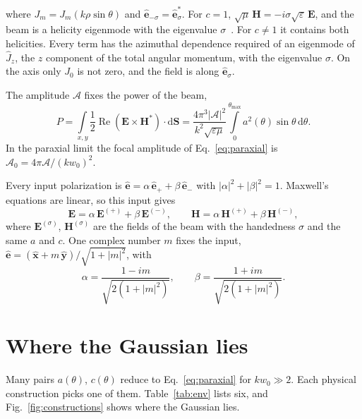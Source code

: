 \documentclass[
	aps,
	pra,
	reprint,
	amsmath,
	amssymb,
	superscriptaddress,
	nofootinbib
]{revtex4-2}
\begin{document}
where $J_m=J_m(k\rho\sin\theta)$ and $\mathbf{\hat e}_{-\sigma}=\mathbf{\hat e}_\sigma^*$. For $c=1$, $\sqrt{\mu}\,\mathbf H=-i\sigma\sqrt{\varepsilon}\,\mathbf E$, and the beam is a helicity eigenmode with the eigenvalue $\sigma$~\cite{FernandezCorbaton2012}. For $c\neq1$ it contains both helicities. Every term has the azimuthal dependence required of an eigenmode of $\hat J_z$, the $z$ component of the total angular momentum, with the eigenvalue $\sigma$. On the axis only $J_0$ is not zero, and the field is along $\mathbf{\hat e}_\sigma$.

The amplitude $\mathcal{A}$ fixes the power of the beam,
\begin{equation}
    P =  \int \limits_{x,y} \frac{1}{2} \operatorname{Re} \left( \mathbf{E} \times \mathbf{H}^{*} \right) \cdot \mathrm{d}  \mathbf{S}=\frac{4\pi^3|\mathcal A|^2}{k^2\sqrt{\varepsilon\mu}}\int \limits_0^{\theta_{\max}}a^2(\theta)\sin\theta\,\mathrm{d}\theta.
    \label{eq:power}
\end{equation}
In the paraxial limit the focal amplitude of Eq.~\eqref{eq:paraxial} is $\mathcal A_0=4\pi\mathcal A/(kw_0)^2$.

Every input polarization is $\mathbf{\hat{e}}=\alpha\,\mathbf{\hat{e}}_++\beta\,\mathbf{\hat{e}}_-$ with $|\alpha|^2+|\beta|^2=1$. Maxwell's equations are linear, so this input gives
\begin{equation}
    \mathbf E=\alpha\,\mathbf E^{(+)}+\beta\,\mathbf E^{(-)},\qquad
    \mathbf H=\alpha\,\mathbf H^{(+)}+\beta\,\mathbf H^{(-)},
    \label{eq:arbitrary}
\end{equation}
where $\mathbf E^{(\sigma)}$, $\mathbf H^{(\sigma)}$ are the fields of the beam with the handedness $\sigma$ and the same $a$ and $c$. One complex number $m$ fixes the input, $\mathbf{\hat{e}}=(\mathbf{\hat{x}}+m\,\mathbf{\hat{y}})/\sqrt{1+|m|^2}$, with
\begin{equation}
    \alpha=\frac{1-i m}{\sqrt{2(1+|m|^2)}},\qquad
    \beta=\frac{1+i m}{\sqrt{2(1+|m|^2)}}.
    \label{eq:m}
\end{equation}

\section{Where the Gaussian lies}


Many pairs $a(\theta)$, $c(\theta)$ reduce to Eq.~\eqref{eq:paraxial} for $kw_0\gg2$. Each physical construction picks one of them. Table~\ref{tab:env} lists six, and Fig.~\ref{fig:constructions} shows where the Gaussian lies.
\end{document}
